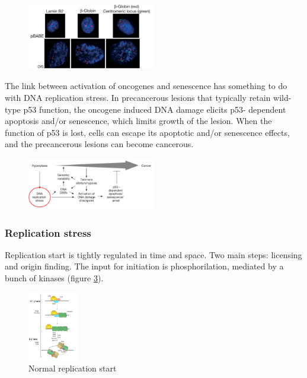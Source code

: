 \begin{figure}[h!]
\centering
\includegraphics[width=0.5\textwidth]{../_resources/b399b9d2beb17cee2a4d602739e97b08.png} 
\label{fig:senescence}
\end{figure}

The link between activation of oncogenes and senescence has something to
do with DNA replication stress. In precancerous lesions that typically
retain wild-type p53 function, the oncogene induced DNA damage elicits
p53- dependent apoptosis and/or senescence, which limits growth of the
lesion. When the function of p53 is lost, cells can escape its apoptotic
and/or senescence effects, and the precancerous lesions can become
cancerous.

\begin{figure}[h!]
\centering
\includegraphics[width=0.5\textwidth]{../_resources/504253851a3ef8203e6353a576814cc4.png} 
\label{fig:senescence}
\end{figure}

\hypertarget{replication-stress}{%
\subsubsection{Replication stress}\label{replication-stress}}

Replication start is tightly regulated in time and space.
Two main steps: licensing and origin finding. The input for initiation
is phosphorilation, mediated by a bunch of kinases (figure \ref{fig:rep}).

\begin{figure}[H]
\centering
\includegraphics[width=0.2\textwidth]{../_resources/cf33180a017e8d51c049566410ac8b20.png}
\caption{Normal replication start}
\label{fig:rep}
\end{figure}

